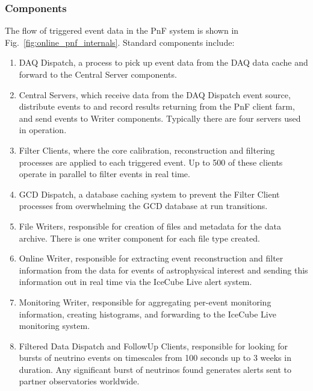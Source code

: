 \subsubsection{Components}

The flow of triggered event data in the PnF
system is shown in Fig.~\ref{fig:online_pnf_internals}.  Standard
components include: 
\begin{enumerate}
\item DAQ Dispatch, a process to pick up event data from the DAQ data cache
  and forward to the Central Server components. 
\item Central Servers, which
  receive data from the 
  DAQ Dispatch event source, distribute events to and record results
  returning from the PnF client farm, and send events to Writer components.
  Typically there are four servers used in operation.
\item Filter Clients, where the core calibration, reconstruction and
  filtering processes are applied to each triggered event.  Up to 500 of
  these clients operate in parallel to filter 
  events in real time.
\item GCD Dispatch, a database caching system to prevent the
  Filter Client processes from overwhelming the GCD database at run transitions.
\item File Writers, responsible for creation of files and metadata for
  the data archive.  There is one writer component for each file type created.
\item Online Writer, responsible for extracting event reconstruction and
  filter information from the data for events of astrophysical interest and
  sending this information out in real time via the IceCube Live alert
  system.
\item Monitoring Writer, responsible for aggregating per-event monitoring
  information, creating histograms, and forwarding to the IceCube Live
  monitoring system.
\item Filtered Data Dispatch and FollowUp Clients, responsible for
  looking for bursts of neutrino events on timescales from 100 seconds up
  to 3 weeks in duration.  Any significant burst of neutrinos found generates alerts
  sent to partner observatories worldwide.
\end{enumerate}

